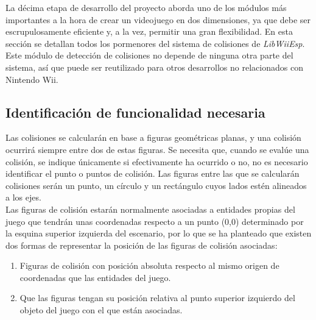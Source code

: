 



La décima etapa de desarrollo del proyecto aborda uno de los módulos más importantes a la hora de crear un videojuego en dos dimensiones, ya que debe ser escrupulosamente eficiente y, a la vez, permitir una gran flexibilidad. En esta sección se detallan todos los pormenores del sistema de colisiones de \emph{LibWiiEsp}.\\

Este módulo de detección de colisiones no depende de ninguna otra parte del sistema, así que puede ser reutilizado para otros desarrollos no relacionados con Nintendo Wii.

\subsection{Identificación de funcionalidad necesaria}

Las colisiones se calcularán en base a figuras geométricas planas, y una colisión ocurrirá siempre entre dos de estas figuras. Se necesita que, cuando se evalúe una colisión, se indique únicamente si efectivamente ha ocurrido o no, no es necesario identificar el punto o puntos de colisión. Las figuras entre las que se calcularán colisiones serán un punto, un círculo y un rectángulo cuyos lados estén alineados a los ejes.\\

Las figuras de colisión estarán normalmente asociadas a entidades propias del juego que tendrán unas coordenadas respecto a un punto (0,0) determinado por la esquina superior izquierda del escenario, por lo que se ha planteado que existen dos formas de representar la posición de las figuras de colisión asociadas:

\begin{enumerate}
\item Figuras de colisión con posición absoluta respecto al mismo origen de coordenadas que las entidades del juego.
\item Que las figuras tengan su posición relativa al punto superior izquierdo del objeto del juego con el que están asociadas.
\end{enumerate}

